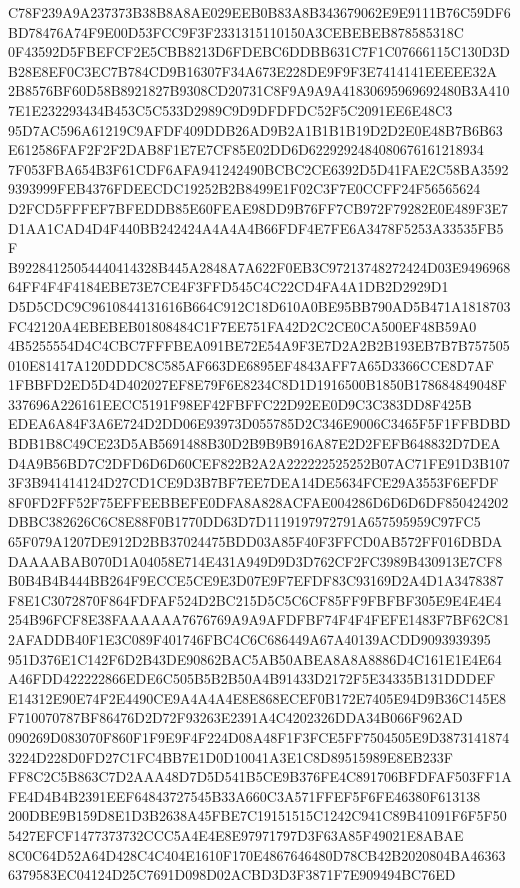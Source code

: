 \documentclass[UTF8,fontset=fandol,zihao=-4,a4paper]{ctexart}
\begin{document}
{{C78F239A9A237373B38B8A8AE029EEB0B83A8B343679062E9E9111B76C59DF6BD78476A74F9E00D53FCC9F3F2331315110150A3CEBEBEB878585318C
0F43592D5FBEFCF2E5CBB8213D6FDEBC6DDBB631C7F1C07666115C130D3DB28E8EF0C3EC7B784CD9B16307F34A673E228DE9F9F3E7414141EEEEE32A
2B8576BF60D58B8921827B9308CD20731C8F9A9A9A41830695969692480B3A4107E1E232293434B453C5C533D2989C9D9DFDFDC52F5C2091EE6E48C3
95D7AC596A61219C9AFDF409DDB26AD9B2A1B1B1B19D2D2E0E48B7B6B63E612586FAF2F2F2DAB8F1E7E7CF85E02DD6D6229292484080676161218934
7F053FBA654B3F61CDF6AFA941242490BCBC2CE6392D5D41FAE2C58BA35929393999FEB4376FDEECDC19252B2B8499E1F02C3F7E0CCFF24F56565624
D2FCD5FFFEF7BFEDDB85E60FEAE98DD9B76FF7CB972F79282E0E489F3E7D1AA1CAD4D4F440BB242424A4A4A4B66FDF4E7FE6A3478F5253A33535FB5F
B92284125054440414328B445A2848A7A622F0EB3C97213748272424D03E949696864FF4F4F4184EBE73E7CE4F3FFD545C4C22CD4FA4A1DB2D2929D1
D5D5CDC9C9610844131616B664C912C18D610A0BE95BB790AD5B471A1818703FC42120A4EBEBEB01808484C1F7EE751FA42D2C2CE0CA500EF48B59A0
4B5255554D4C4CBC7FFFBEA091BE72E54A9F3E7D2A2B2B193EB7B7B757505010E81417A120DDDC8C585AF663DE6895EF4843AFF7A65D3366CCE8D7AF
1FBBFD2ED5D4D402027EF8E79F6E8234C8D1D1916500B1850B178684849048F337696A226161EECC5191F98EF42FBFFC22D92EE0D9C3C383DD8F425B
EDEA6A84F3A6E724D2DD06E93973D055785D2C346E9006C3465F5F1FFBDBDBDB1B8C49CE23D5AB5691488B30D2B9B9B916A87E2D2FEFB648832D7DEA
D4A9B56BD7C2DFD6D6D60CEF822B2A2A222222525252B07AC71FE91D3B1073F3B941414124D27CD1CE9D3B7BF7EE7DEA14DE5634FCE29A3553F6EFDF
8F0FD2FF52F75EFFEEBBEFE0DFA8A828ACFAE004286D6D6D6DF850424202DBBC382626C6C8E88F0B1770DD63D7D1119197972791A657595959C97FC5
65F079A1207DE912D2BB37024475BDD03A85F40F3FFCD0AB572FF016DBDADAAAABAB070D1A04058E714E431A949D9D3D762CF2FC3989B430913E7CF8
B0B4B4B444BB264F9ECCE5CE9E3D07E9F7EFDF83C93169D2A4D1A3478387F8E1C3072870F864FDFAF524D2BC215D5C5C6CF85FF9FBFBF305E9E4E4E4
254B96FCF8E38FAAAAAA7676769A9A9AFDFBF74F4F4FEFE1483F7BF62C812AFADDB40F1E3C089F401746FBC4C6C686449A67A40139ACDD9093939395
951D376E1C142F6D2B43DE90862BAC5AB50ABEA8A8A8886D4C161E1E4E64A46FDD422222866EDE6C505B5B2B50A4B91433D2172F5E34335B131DDDEF
E14312E90E74F2E4490CE9A4A4A4E8E868ECEF0B172E7405E94D9B36C145E8F710070787BF86476D2D72F93263E2391A4C4202326DDA34B066F962AD
090269D083070F860F1F9E9F4F224D08A48F1F3FCE5FF7504505E9D38731418743224D228D0FD27C1FC4BB7E1D0D10041A3E1C8D89515989E8EB233F
FF8C2C5B863C7D2AAA48D7D5D541B5CE9B376FE4C891706BFDFAF503FF1AFE4D4B4B2391EEF64843727545B33A660C3A571FFEF5F6FE46380F613138
200DBE9B159D8E1D3B2638A45FBE7C19151515C1242C941C89B41091F6F5F505427EFCF1477373732CCC5A4E4E8E97971797D3F63A85F49021E8ABAE
8C0C64D52A64D428C4C404E1610F170E4867646480D78CB42B2020804BA463636379583EC04124D25C7691D098D02ACBD3D3F3871F7E909494BC76ED
}}
\end{document}
